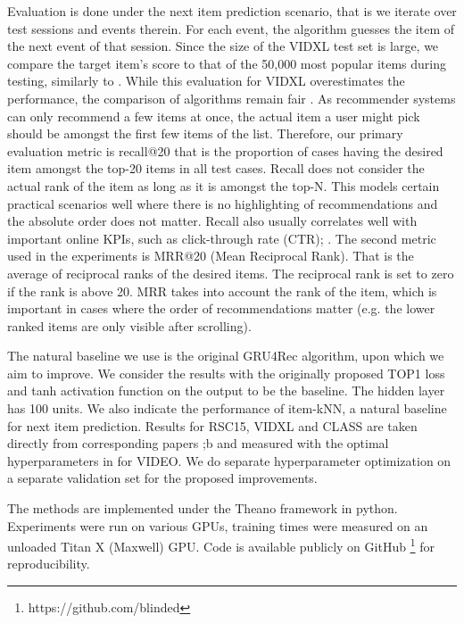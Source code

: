 Evaluation is done under the next item prediction scenario, that is we iterate over test sessions and events therein. For each event, the algorithm guesses the item of the next event of that session. Since the size of the VIDXL test set is large, we compare the target item’s score to that of the 50,000 most popular items during testing, similarly to \cite{hidasi2016a}. While this evaluation for VIDXL overestimates the performance, the comparison of algorithms remain fair \cite{bellogin2011precision}. As recommender systems can only recommend a few items at once, the actual item a user might pick should be amongst the first few items of the list. Therefore, our primary evaluation metric is recall@20 that is the proportion of cases having the desired item amongst the top-20 items in all test cases. Recall does not consider the actual rank of the item as long as it is amongst the top-N. This models certain practical scenarios well where there is no highlighting of recommendations and the absolute order does not matter. Recall also usually correlates well with important online KPIs, such as click-through rate (CTR)\cite{liu2012enlister}; \cite{hidasi2012fast}. The second metric used in the experiments is MRR@20 (Mean Reciprocal Rank). That is the average of reciprocal ranks of the desired items. The reciprocal rank is set to zero if the rank is above 20. MRR takes into account the rank of the item, which is important in cases where the order of recommendations matter (e.g. the
lower ranked items are only visible after scrolling).

The natural baseline we use is the original GRU4Rec algorithm, upon which we aim to improve. We consider the results with the originally proposed TOP1 loss and tanh activation function on the
output to be the baseline. The hidden layer has 100 units. We also indicate the performance of item-kNN, a natural baseline for next item prediction. Results for RSC15, VIDXL and CLASS are
taken directly from corresponding papers \cite{hidasi2016a};b and measured with the optimal hyperparameters in \cite{hidasi2016a} for VIDEO. We do separate hyperparameter optimization on a separate validation set for the proposed improvements.

The methods are implemented under the Theano framework 
\cite{al2016theano}in python. Experiments were run on various GPUs, training times were measured on an unloaded Titan X (Maxwell) GPU. Code is available publicly on GitHub \footnote[10]{https://github.com/blinded} for reproducibility.

